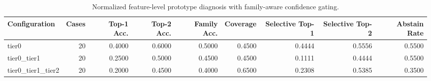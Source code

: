 \begin{table}[t]
\centering
\caption{Normalized feature-level prototype diagnosis with family-aware confidence gating.}
\label{tab:dice_stressor_hierarchical_diagnosis}
\footnotesize
\begin{tabular}{lrrrrrrrr}
\toprule
Configuration & Cases & Top-1 Acc. & Top-2 Acc. & Family Acc. & Coverage & Selective Top-1 & Selective Top-2 & Abstain Rate \\
\midrule
tier0 & 20 & 0.4000 & 0.6000 & 0.5000 & 0.4500 & 0.4444 & 0.5556 & 0.5500 \\
tier0_tier1 & 20 & 0.2500 & 0.5000 & 0.4500 & 0.4500 & 0.1111 & 0.4444 & 0.5500 \\
tier0_tier1_tier2 & 20 & 0.2000 & 0.4500 & 0.4000 & 0.6500 & 0.2308 & 0.5385 & 0.3500 \\
\bottomrule
\end{tabular}

\end{table}
